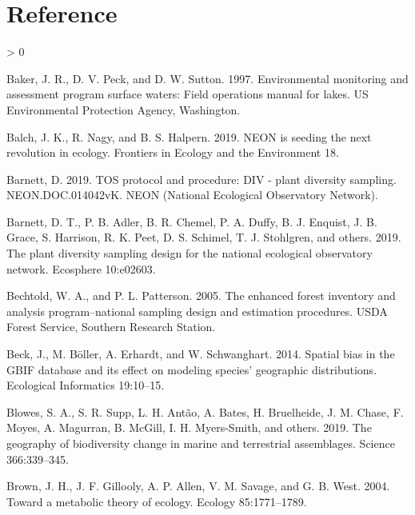 \documentclass[
  12pt,
]{article}
\newlength{\cslhangindent}
\newenvironment{CSLReferences}[2] %
 {%
  \setlength{\parindent}{0pt}
  \ifodd #1 \everypar{\setlength{\hangindent}{\cslhangindent}}\ignorespaces\fi
  \ifnum #2 > 0
  \setlength{\parskip}{#2\baselineskip}
  \fi
 }%
 {}
\begin{document}
\hypertarget{reference}{%
\section*{Reference}\label{reference}}

\hypertarget{refs}{}
\begin{CSLReferences}{1}{0}
\leavevmode\hypertarget{ref-baker1997environmental}{}%
Baker, J. R., D. V. Peck, and D. W. Sutton. 1997. Environmental monitoring and assessment program surface waters: Field operations manual for lakes. US Environmental Protection Agency, Washington.

\leavevmode\hypertarget{ref-balch2019neon}{}%
Balch, J. K., R. Nagy, and B. S. Halpern. 2019. NEON is seeding the next revolution in ecology. Frontiers in Ecology and the Environment 18.

\leavevmode\hypertarget{ref-Barnett2019}{}%
Barnett, D. 2019. TOS protocol and procedure: DIV - plant diversity sampling. NEON.DOC.014042vK. NEON (National Ecological Observatory Network).

\leavevmode\hypertarget{ref-barnett2019plant}{}%
Barnett, D. T., P. B. Adler, B. R. Chemel, P. A. Duffy, B. J. Enquist, J. B. Grace, S. Harrison, R. K. Peet, D. S. Schimel, T. J. Stohlgren, and others. 2019. The plant diversity sampling design for the national ecological observatory network. Ecosphere 10:e02603.

\leavevmode\hypertarget{ref-bechtold2005enhanced}{}%
Bechtold, W. A., and P. L. Patterson. 2005. The enhanced forest inventory and analysis program--national sampling design and estimation procedures. USDA Forest Service, Southern Research Station.

\leavevmode\hypertarget{ref-beck2014spatial}{}%
Beck, J., M. Böller, A. Erhardt, and W. Schwanghart. 2014. Spatial bias in the GBIF database and its effect on modeling species' geographic distributions. Ecological Informatics 19:10--15.

\leavevmode\hypertarget{ref-blowes2019geography}{}%
Blowes, S. A., S. R. Supp, L. H. Antão, A. Bates, H. Bruelheide, J. M. Chase, F. Moyes, A. Magurran, B. McGill, I. H. Myers-Smith, and others. 2019. The geography of biodiversity change in marine and terrestrial assemblages. Science 366:339--345.

\leavevmode\hypertarget{ref-brown2004toward}{}%
Brown, J. H., J. F. Gillooly, A. P. Allen, V. M. Savage, and G. B. West. 2004. Toward a metabolic theory of ecology. Ecology 85:1771--1789.


\end{CSLReferences}
\end{document}
